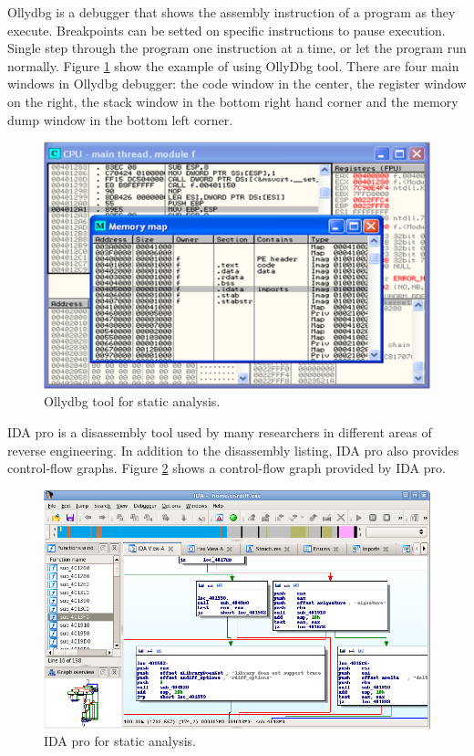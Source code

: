 Ollydbg is a debugger that shows the assembly instruction of a program as they execute. Breakpoints can be setted on specific instructions to pause execution. Single step through the program one instruction at a time, or let the program run normally. Figure \ref{fig:OllyDbg} show the example of using OllyDbg tool. There are four main windows in Ollydbg debugger: the code window in the center, the register window on the right, the stack window in the bottom right hand  corner and the memory dump window in the bottom left corner. 

\begin{figure}[h!]
\centering
\includegraphics[width=1\textwidth]{graph/OllyDbg.png}
\caption{Ollydbg tool for static analysis.}
\label{fig:OllyDbg}
\end{figure}

IDA pro is a disassembly tool used by many researchers in different areas of reverse engineering. In addition to the disassembly listing, IDA pro also provides control-flow graphs. Figure \ref{fig:IDApro} shows a control-flow graph provided by IDA pro.

\begin{figure}[h!]
\centering
\includegraphics[width=1\textwidth]{graph/idapro.png}
\caption{IDA pro for static analysis.}
\label{fig:IDApro}
\end{figure}


